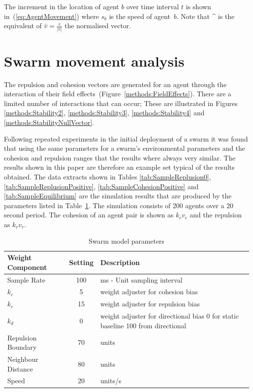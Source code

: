 \documentclass{ieeeaccess}
\begin{document}
The increment in the location of agent $b$ over time interval $t$ is shown in~(\ref{eq:AgentMovement}) where $s_b$ is the speed of agent~$b$. Note that \string^ is the equivalent of $\hat{v} = \frac{v}{|v|}$ the normalised vector.

\section{Swarm movement analysis\label{metric:MagnitudeDynamics2}}
The repulsion and cohesion vectors are generated for an agent through the interaction of their field effects~(Figure~\ref{methods:FieldEffects}). There are a limited number of interactions that can occur; These are illustrated in Figures \ref{methods:Stability2}, \ref{methods:Stability3}, \ref{methods:Stability4} and \ref{methods:StabilityNullVector}.

Following repeated experiments in the initial deployment of a swarm it was found that using the same parameters for a swarm's environmental parameters and the cohesion and repulsion ranges that the results where always very similar. The results shown in this paper are therefore an example set typical of the results obtained. The data extracts shown in Tables \ref{tab:SampleReplusion0}, \ref{tab:SampleReplusionPositive}, \ref{tab:SampleCohesionPositive} and  \ref{tab:SampleEquilibrium} are the simulation results that are produced by the parameters listed in Table~\ref{tab:MetricPhysics1}. The simulation consists of 200 agents over a 20 second period. The cohesion of an agent pair is shown as $k_cv_c$ and the repulsion as $k_rv_r$.

\begin{table}[H]
\begin{center}
\begin{tabular}{| p{2.5cm} | c | p{3cm} |}
\hline
\bf Weight \bf Component & \bf Setting & \bf Description \\ \hline
Sample Rate & 100 & ms - Unit sampling interval\\  \hline
$k_c$ & 5 & weight adjuster for cohesion bias\\  \hline
$k_r$ & 15 & weight adjuster for repulsion  bias\\  \hline
$k_d$ & 0 & weight adjuster for directional bias 0 for static baseline 100 from directional\\  \hline
Repulsion Boundary & 70 & units\\  \hline
Neighbour Distance & 80 & units\\  \hline
Speed & 20 & units/s\\  \hline
\end{tabular}\caption{Swarm model parameters} \label{tab:MetricPhysics1}
\end{center}
\end{table}
\end{document}
